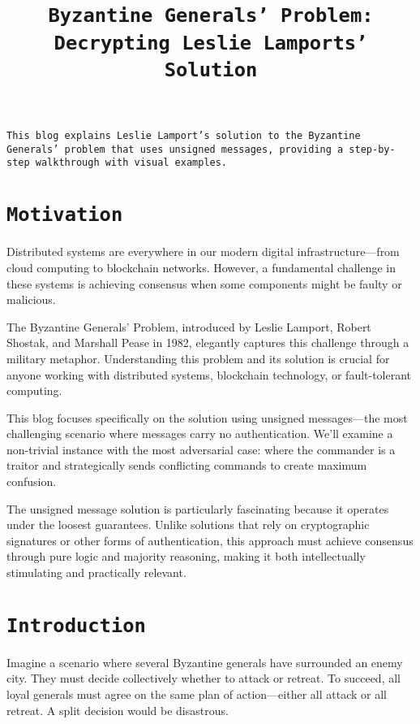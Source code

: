 \documentclass[11pt]{article}
\title{\texttt{\LARGE Byzantine Generals' Problem: \\[0.3em] \Large Decrypting Leslie Lamports' Solution}}
\date{}
\begin{document}
\maketitle

\begin{center}
\begin{minipage}{0.85\textwidth}
\texttt{\large This blog explains Leslie Lamport's solution to the Byzantine Generals' problem that uses unsigned messages, providing a step-by-step walkthrough with visual examples.}
\end{minipage}
\end{center}
\vspace{1em}

\section*{\texttt{\Large Motivation}}
Distributed systems are everywhere in our modern digital infrastructure—from cloud computing to blockchain networks. However, a fundamental challenge in these systems is achieving consensus when some components might be faulty or malicious.

The Byzantine Generals' Problem, introduced by Leslie Lamport, Robert Shostak, and Marshall Pease in 1982, elegantly captures this challenge through a military metaphor. Understanding this problem and its solution is crucial for anyone working with distributed systems, blockchain technology, or fault-tolerant computing.

This blog focuses specifically on the solution using unsigned messages—the most challenging scenario where messages carry no authentication. We'll examine a non-trivial instance with the most adversarial case: where the commander is a traitor and strategically sends conflicting commands to create maximum confusion.

The unsigned message solution is particularly fascinating because it operates under the loosest guarantees. Unlike solutions that rely on cryptographic signatures or other forms of authentication, this approach must achieve consensus through pure logic and majority reasoning, making it both intellectually stimulating and practically relevant.
\section*{\texttt{\Large Introduction}}
Imagine a scenario where several Byzantine generals have surrounded an enemy city. They must decide collectively whether to attack or retreat. To succeed, all loyal generals must agree on the same plan of action—either all attack or all retreat. A split decision would be disastrous.
\end{document}
